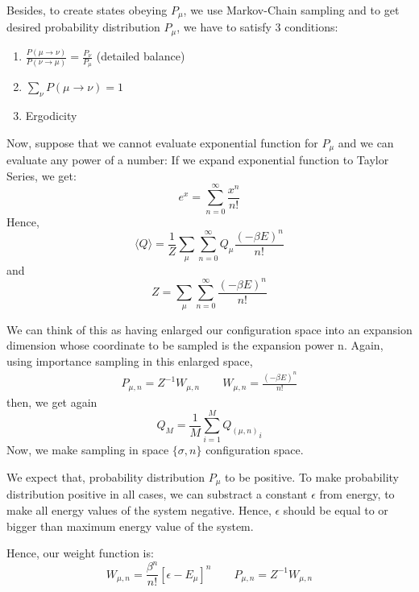 \documentclass[12pt,fleqn]{report}
\begin{document}
Besides, to create states obeying $P_\mu$, we use Markov-Chain sampling 
and to get desired probability distribution $P_\mu$, we have to satisfy 3 
conditions: 
\begin{enumerate}
\item $\frac{P(\mu \rightarrow \nu)}{P(\nu \rightarrow \mu)} = \frac{P_\nu 
}{P_\mu } $ (detailed balance)
\item $\sum\limits_{\nu} P(\mu \rightarrow \nu )  =1 $
\item Ergodicity
\end{enumerate}

Now, suppose that we cannot evaluate exponential function for $P_\mu$ 
and we can evaluate any power of a number: 
If we expand exponential function to Taylor Series, we get:
$$
e^x = \sum_{n=0}^\infty \frac{x^n}{n!}
$$
Hence, 
\begin{equation}
\langle Q \rangle =\frac{1}{Z} \sum\limits_{\mu} \sum_{n=0}^\infty 
Q_\mu \frac{(-\beta E)^n}{n!}
\end{equation}
and 
\begin{equation}
Z=\sum\limits_{\mu} \sum_{n=0}^\infty 
\frac{(-\beta E)^n}{n!}
\end{equation}

We can think of this as having enlarged our configuration space into an 
expansion dimension whose coordinate to be sampled is the expansion 
power n.\cite{sandvik_sse}
Again, using importance sampling in this enlarged space,
\begin{gather}
P_{\mu,n} = Z^{-1}W_{\mu,n} \qquad
W_{\mu,n} = \frac{(-\beta E)^n}{n!}
\end{gather}
then, we get again
\begin{equation}
Q_M = \frac{1}{M} \sum\limits_{i=1}^M {Q_{(\mu,n)}}_i 
\end{equation}
Now, we make sampling in space $\{\sigma,n\}$ configuration space. 

We expect that, probability distribution $P_\mu$ to be positive. To make 
probability distribution positive in all cases, we can substract a constant 
$\epsilon$ from energy, to make all energy values of the system negative. 
Hence, $\epsilon$ should be equal to or bigger than maximum energy 
value of the system.

Hence, our weight function is:
\begin{equation}
W_{\mu,n} = \frac{\beta^n}{n!} [\epsilon - E_\mu]^n \qquad P_{\mu,n} = 
Z^{-1}W_{\mu,n}
\end{equation}
\end{document}
